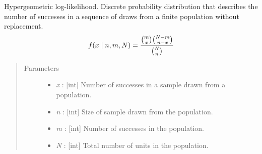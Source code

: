\documentclass[letterpaper,10pt,english]{sphinxmanual}
\begin{document}
\begin{fulllineitems}
\label{distributions:pymc.distributions.hypergeometric_like}
Hypergeometric log-likelihood. Discrete probability distribution that
describes the number of successes in a sequence of draws from a finite
population without replacement.
\begin{gather}
\begin{split}f(x \mid n, m, N) = \frac{\binom{m}{x}\binom{N-m}{n-x}}{\binom{N}{n}}\end{split}\notag
\end{gather}\begin{quote}\begin{description}
\item[{Parameters }] \leavevmode\begin{itemize}
\item {} 
\emph{x} : {[}int{]} Number of successes in a sample drawn from a population.

\item {} 
\emph{n} : {[}int{]} Size of sample drawn from the population.

\item {} 
\emph{m} : {[}int{]} Number of successes in the population.

\item {} 
\emph{N} : {[}int{]} Total number of units in the population.

\end{itemize}

\end{description}\end{quote}

\end{fulllineitems}

\end{document}

